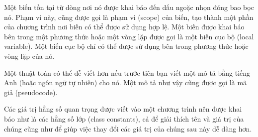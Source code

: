 Một biến tồn tại từ dòng nơi nó được khai báo đến dấu ngoặc nhọn đóng
bao bọc nó. Phạm vi này, cũng được gọi là phạm vi (scope) của biến, tạo
thành một phần của chương trình nơi biến có thể được sử dụng hợp lệ. Một
biến được khai báo bên trong một phương thức hoặc một vòng lặp được gọi
là một biến cục bộ (local variable). Một biến cục bộ chỉ có thể được sử
dụng bên trong phương thức hoặc vòng lặp của nó.

Một thuật toán có thể dễ viết hơn nếu trước tiên bạn viết một mô tả bằng
tiếng Anh (hoặc ngôn ngữ tự nhiên) cho nó. Một mô tả như vậy cũng được
gọi là mã giả (pseudocode).

Các giá trị hằng số quan trọng được viết vào một chương trình nên được
khai báo như là các hằng số lớp (class constants), cả để giải thích tên
và giá trị của chúng cũng như để giúp việc thay đổi các giá trị của
chúng sau này dễ dàng hơn.
